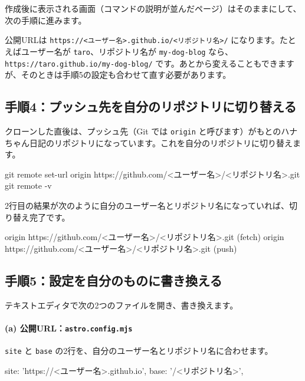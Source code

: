 \documentclass[a4paper,11pt]{ltjsarticle}
\newcommand{\file}[1]{\texttt{#1}}
\begin{document}
作成後に表示される画面（コマンドの説明が並んだページ）はそのままにして、次の手順に進みます。

\begin{hint}[リポジトリ名がURLになる]
公開URLは \file{https://<ユーザー名>.github.io/<リポジトリ名>/} になります。たとえばユーザー名が \file{taro}、リポジトリ名が \file{my-dog-blog} なら、\file{https://taro.github.io/my-dog-blog/} です。あとから変えることもできますが、そのときは手順5の設定も合わせて直す必要があります。
\end{hint}

\subsection{手順4：プッシュ先を自分のリポジトリに切り替える}

クローンした直後は、プッシュ先（Git では \file{origin} と呼びます）がもとのハナちゃん日記のリポジトリになっています。これを自分のリポジトリに切り替えます。

\begin{code}
git remote set-url origin https://github.com/<ユーザー名>/<リポジトリ名>.git
git remote -v
\end{code}

2行目の結果が次のように自分のユーザー名とリポジトリ名になっていれば、切り替え完了です。

\begin{code}
origin  https://github.com/<ユーザー名>/<リポジトリ名>.git (fetch)
origin  https://github.com/<ユーザー名>/<リポジトリ名>.git (push)
\end{code}

\subsection{手順5：設定を自分のものに書き換える}

テキストエディタで次の2つのファイルを開き、書き換えます。

\paragraph{(a) 公開URL：\file{astro.config.mjs}}

\file{site} と \file{base} の2行を、自分のユーザー名とリポジトリ名に合わせます。

\begin{code}
site: 'https://<ユーザー名>.github.io',
base: '/<リポジトリ名>',
\end{code}
\end{document}
